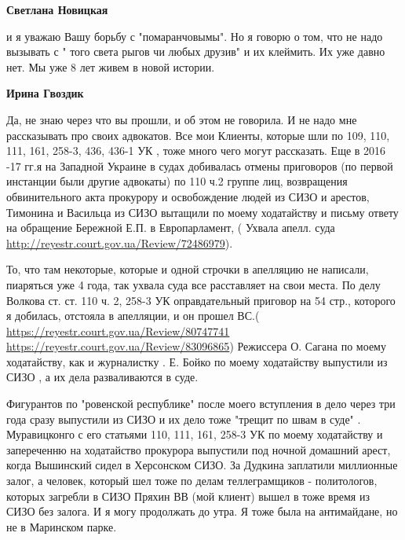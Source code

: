 \begin{itemize}
\begin{itemize}
 
\textbf{Светлана Новицкая} 

и я уважаю Вашу борьбу с "помаранчовымы". Но я говорю о том, что не надо
вызывать с " того света рыгов чи любых друзив" и их клеймить. Их уже давно нет.
Мы уже 8 лет живем в новой истории.

 
\textbf{Ирина Гвоздик} 

Да, не знаю через что вы прошли, и об этом не говорила. И не надо мне
рассказывать про своих адвокатов. Все мои Клиенты, которые шли по 109, 110,
111, 161, 258-3, 436, 436-1 УК , тоже много чего могут рассказать. Еще в 2016
-17 гг.я на Западной Украине в судах добивалась отмены приговоров (по первой
инстанции были другие адвокаты) по 110 ч.2 группе лиц, возвращения
обвинительного акта прокурору и освобождение людей из СИЗО и арестов, Тимонина
и Васильца из СИЗО вытащили по моему ходатайству и письму ответу на обращение
Бережной Е.П. в Европарламент, ( Ухвала апелл. суда
\url{http://reyestr.court.gov.ua/Review/72486979}).

То, что там некоторые, которые и одной строчки в апелляцию не написали,
пиаряться уже 4 года, так ухвала суда все расставляет на свои места. По делу
Волкова ст. ст. 110 ч. 2, 258-3 УК оправдательный приговор на 54 стр., которого
я добилась, отстояла в апелляции, и он прошел ВС.(
\url{https://reyestr.court.gov.ua/Review/80747741}
\url{https://reyestr.court.gov.ua/Review/83096865}) Режиссера О. Сагана по моему
ходатайству, как и журналистку . Е. Бойко по моему ходатайству выпустили из
СИЗО , а их дела разваливаются в суде. 

Фигурантов по "ровенской республике" после моего вступления в дело через три
года сразу выпустили из СИЗО и их дело тоже "трещит по швам в суде" .
Муравицконго с его статьями 110, 111, 161, 258-3 УК по моему ходатайству и
запереченню на ходатайство прокурора выпустили под ночной домашний арест, когда
Вышинский сидел в Херсонском СИЗО. За Дудкина заплатили миллионные залог, а
человек, который шел тоже по делам теллеграмщиков - политологов, которых
загребли в СИЗО Пряхин ВВ (мой клиент) вышел в тоже время из СИЗО без залога. И
я могу продолжать до утра. Я тоже была на антимайдане, но не в Маринском парке.


\end{itemize}
\end{itemize}
